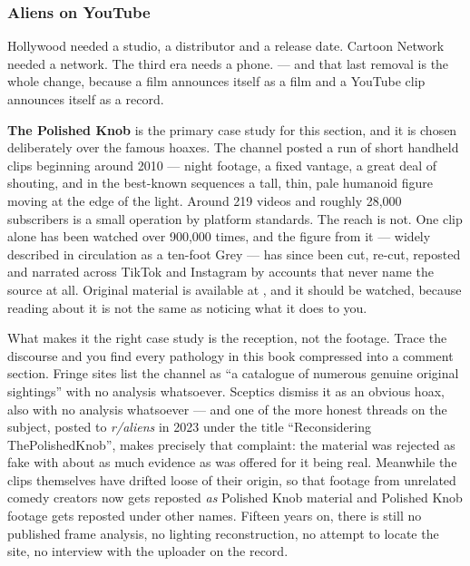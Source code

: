 \subsubsection{Aliens on YouTube}

Hollywood needed a studio, a distributor and a release date. Cartoon Network needed a network. The
third era needs a phone.  --- and that last removal is the whole change, because a film announces itself as a film
and a YouTube clip announces itself as a record.

\textbf{The Polished Knob} is the primary case study for this section, and it is chosen deliberately
over the famous hoaxes. The channel posted a run of short handheld clips beginning around 2010 ---
night footage, a fixed vantage, a great deal of shouting, and in the best-known sequences a tall,
thin, pale humanoid figure moving at the edge of the light. Around 219 videos and roughly 28,000
subscribers is a small operation by platform standards. The reach is not.
One clip alone has been watched over 900,000 times, and the figure from it --- widely described in
circulation as a ten-foot Grey --- has since been cut, re-cut, reposted and narrated across TikTok and
Instagram by accounts that never name the source at all. Original material is available at
, and it should be watched, because reading about it
is not the same as noticing what it does to you.

What makes it the right case study is the reception, not the footage. Trace the discourse and you find
every pathology in this book compressed into a comment section. Fringe sites list the channel as ``a
catalogue of numerous genuine original sightings'' with no analysis whatsoever. Sceptics dismiss it as
an obvious hoax, also with no analysis whatsoever --- and one of the more honest threads on the
subject, posted to \emph{r/aliens} in 2023 under the title ``Reconsidering ThePolishedKnob'', makes
precisely that complaint: the material was rejected as fake with about as much evidence as was offered
for it being real. Meanwhile the clips themselves have drifted loose of their origin, so that footage
from unrelated comedy creators now gets reposted \emph{as} Polished Knob material and Polished Knob
footage gets reposted under other names.  Fifteen years on,
there is still no published frame analysis, no lighting reconstruction, no attempt to locate the site,
no interview with the uploader on the record.

